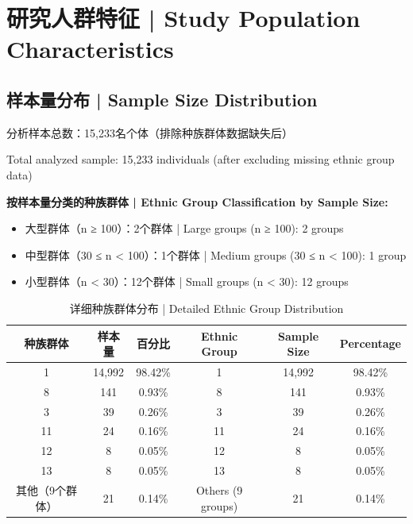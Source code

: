 \documentclass[12pt,a4paper]{article}
\begin{document}
\section{研究人群特征 | Study Population Characteristics}

\subsection{样本量分布 | Sample Size Distribution}

分析样本总数：15,233名个体（排除种族群体数据缺失后）

Total analyzed sample: 15,233 individuals (after excluding missing ethnic group data)

\textbf{按样本量分类的种族群体 | Ethnic Group Classification by Sample Size:}
\begin{itemize}
    \item 大型群体（n ≥ 100）：2个群体 | Large groups (n ≥ 100): 2 groups
    \item 中型群体（30 ≤ n < 100）：1个群体 | Medium groups (30 ≤ n < 100): 1 group
    \item 小型群体（n < 30）：12个群体 | Small groups (n < 30): 12 groups
\end{itemize}

\begin{table}[H]
\centering
\caption{详细种族群体分布 | Detailed Ethnic Group Distribution}
\begin{tabular}{@{}cccccc@{}}
\toprule
\textbf{种族群体} & \textbf{样本量} & \textbf{百分比} & \textbf{Ethnic Group} & \textbf{Sample Size} & \textbf{Percentage} \\
\midrule
1 & 14,992 & 98.42\% & 1 & 14,992 & 98.42\% \\
8 & 141 & 0.93\% & 8 & 141 & 0.93\% \\
3 & 39 & 0.26\% & 3 & 39 & 0.26\% \\
11 & 24 & 0.16\% & 11 & 24 & 0.16\% \\
12 & 8 & 0.05\% & 12 & 8 & 0.05\% \\
13 & 8 & 0.05\% & 13 & 8 & 0.05\% \\
其他（9个群体） & 21 & 0.14\% & Others (9 groups) & 21 & 0.14\% \\
\bottomrule
\end{tabular}
\end{table}
\end{document}

